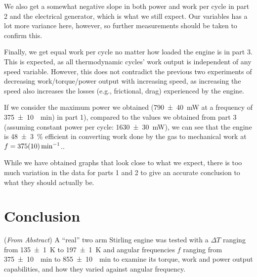 \documentclass[a4paper]{scrartcl}
\begin{document}
We also get a somewhat negative slope in both power and work per cycle in part 2 and the electrical generator, which is what we still expect. Our variables has a lot more variance here, however, so further measurements should be taken to confirm this.

Finally, we get equal work per cycle no matter how loaded the engine is in part 3. This is expected, as all thermodynamic cycles' work output is independent of any speed variable. However, this does not contradict the previous two experiments of decreasing work/torque/power output with increasing speed, as increasing the speed also increases the losses (e.g., frictional, drag) experienced by the engine.

If we consider the maximum power we obtained (\SI{790 \pm 40}{\milli\watt} at a frequency of \SI{375 \pm 10}{\per\minute}) in part 1), compared to the values we obtained from part 3 (assuming constant power per cycle: \SI{1630 \pm 30}{\milli\watt}), we can see that the engine is \SI{48 \pm 3}{\percent} efficient in converting work done by the gas to mechanical work at \(f = \SI{375 \pm 10}{\per\minute}\)..

While we have obtained graphs that look close to what we expect, there is too much variation in the data for parts 1 and 2 to give an accurate conclusion to what they should actually be.

\section{Conclusion}
(\emph{From Abstract}) A ``real'' two arm Stirling engine was tested with a \(\Delta T\) ranging from \SI{135 \pm 1}{\kelvin} to \SI{197 \pm 1}{\kelvin} and angular frequencies \(f\) ranging from \SI{375 \pm 10}{\per\minute} to \SI{855 \pm 10}{\per\minute} to examine its torque, work and power output capabilities, and how they varied against angular frequency.
\end{document}
